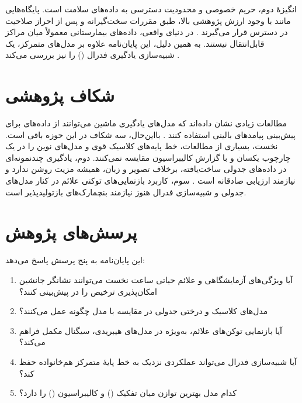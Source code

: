 انگیزۀ دوم، حریم خصوصی و محدودیت دسترسی به داده‌های سلامت است. پایگاه‌هایی مانند  با وجود ارزش پژوهشی بالا، طبق مقررات سخت‌گیرانه و پس از احراز صلاحیت در دسترس قرار می‌گیرند \cite{johnson2023mimic,goldberger2000physionet}. در دنیای واقعی، داده‌های بیمارستانی معمولاً میان مراکز قابل‌انتقال نیستند. به همین دلیل، این پایان‌نامه علاوه بر مدل‌های متمرکز، یک شبیه‌سازی یادگیری فدرال () را نیز بررسی می‌کند \cite{mcmahan2017communication,li2019federated}.

\section{شکاف پژوهشی}
مطالعات زیادی نشان داده‌اند که مدل‌های یادگیری ماشین می‌توانند از داده‌های  برای پیش‌بینی پیامدهای بالینی استفاده کنند \cite{rajkomar2018scalable}. بااین‌حال، سه شکاف در این حوزه باقی است. نخست، بسیاری از مطالعات، خط پایه‌های کلاسیک قوی و مدل‌های نوین را در یک چارچوب یکسان و با گزارش کالیبراسیون مقایسه نمی‌کنند. دوم، یادگیری چندنمونه‌ای در داده‌های جدولی ساخت‌یافته، برخلاف تصویر و زبان، همیشه مزیت روشن ندارد و نیازمند ارزیابی صادقانه است \cite{snell2017prototypical,vinyals2016matching}. سوم، کاربرد بازنمایی‌های توکنی علائم در کنار مدل‌های جدولی و شبیه‌سازی فدرال هنوز نیازمند بنچمارک‌های بازتولیدپذیر است.

\section{پرسش‌های پژوهش}
این پایان‌نامه به پنج پرسش پاسخ می‌دهد:
\begin{enumerate}
\item آیا ویژگی‌های آزمایشگاهی و علائم حیاتی  ساعت نخست  می‌توانند نشانگر جانشین امکان‌پذیری ترخیص را در  پیش‌بینی کنند؟
\item مدل‌های کلاسیک و درختی جدولی در مقایسه با مدل  چگونه عمل می‌کنند؟
\item آیا بازنمایی توکن‌های علائم، به‌ویژه در مدل‌های هیبریدی، سیگنال مکمل فراهم می‌کند؟
\item آیا شبیه‌سازی فدرال می‌تواند عملکردی نزدیک به خط پایۀ متمرکز هم‌خانواده حفظ کند؟
\item کدام مدل بهترین توازن میان تفکیک () و کالیبراسیون () را دارد؟
\end{enumerate}

